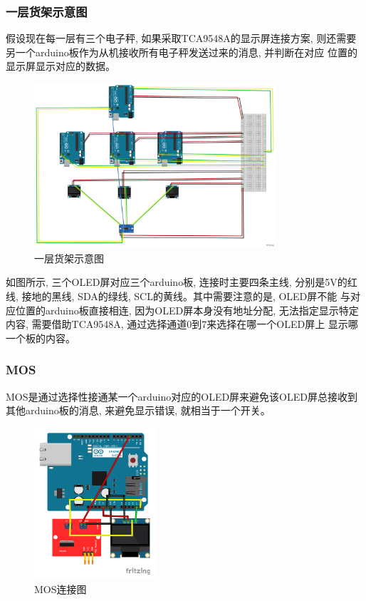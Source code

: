 \documentclass{article}
\begin{document}
\subsubsection{一层货架示意图}
假设现在每一层有三个电子秤, 如果采取TCA9548A的显示屏连接方案, 则还需要另一个arduino板作为从机接收所有电子秤发送过来的消息, 并判断在对应
位置的显示屏显示对应的数据。

\begin{figure}[h]
  \centering
  \includegraphics[width=0.8\textwidth]{../4_Chapter4_COMMUNICATION/Picture/一层货架示意图.pdf}
  \caption{一层货架示意图}
  \label{fig:一层货架示意图}
\end{figure}

如图所示, 三个OLED屏对应三个arduino板, 连接时主要四条主线, 分别是5V的红线, 接地的黑线, SDA的绿线, SCL的黄线。其中需要注意的是, OLED屏不能
与对应位置的arduino板直接相连, 因为OLED屏本身没有地址分配, 无法指定显示特定内容, 需要借助TCA9548A, 通过选择通道0到7来选择在哪一个OLED屏上
显示哪一个板的内容。

\subsubsection{MOS}
MOS是通过选择性接通某一个arduino对应的OLED屏来避免该OLED屏总接收到其他arduino板的消息, 来避免显示错误, 就相当于一个开关。
\begin{figure}[h]
  \centering
  \includegraphics[width=0.4\textwidth]{../4_Chapter4_COMMUNICATION/Picture/MOS.pdf}
  \caption{MOS连接图}
  \label{fig:MOS连接图}
\end{figure}
\end{document}
